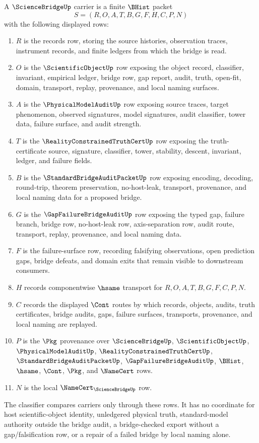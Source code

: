 \begin{definition}
\label{def:science-bridge-carrier}
A $\ScienceBridgeUp$ carrier is a finite $\BHist$ packet
$$
S=(R,O,A,T,B,G,F,H,C,P,N)
$$
with the following displayed rows:
\begin{enumerate}
\item $R$ is the records row, storing the source histories, observation traces, instrument records, and finite ledgers from which the bridge is read.
\item $O$ is the $\ScientificObjectUp$ row exposing the object record, classifier, invariant, empirical ledger, bridge row, gap report, audit, truth, open-fit, domain, transport, replay, provenance, and local naming surfaces.
\item $A$ is the $\PhysicalModelAuditUp$ row exposing source traces, target phenomenon, observed signatures, model signatures, audit classifier, tower data, failure surface, and audit strength.
\item $T$ is the $\RealityConstrainedTruthCertUp$ row exposing the truth-certificate source, signature, classifier, tower, stability, descent, invariant, ledger, and failure fields.
\item $B$ is the $\StandardBridgeAuditPacketUp$ row exposing encoding, decoding, round-trip, theorem preservation, no-host-leak, transport, provenance, and local naming data for a proposed bridge.
\item $G$ is the $\GapFailureBridgeAuditUp$ row exposing the typed gap, failure branch, bridge row, no-host-leak row, axis-separation row, audit route, transport, replay, provenance, and local naming data.
\item $F$ is the failure-surface row, recording falsifying observations, open prediction gaps, bridge defeats, and domain exits that remain visible to downstream consumers.
\item $H$ records componentwise $\hsame$ transport for $R,O,A,T,B,G,F,C,P,N$.
\item $C$ records the displayed $\Cont$ routes by which records, objects, audits, truth certificates, bridge audits, gaps, failure surfaces, transports, provenance, and local naming are replayed.
\item $P$ is the $\Pkg$ provenance over $\ScienceBridgeUp$, $\ScientificObjectUp$, $\PhysicalModelAuditUp$, $\RealityConstrainedTruthCertUp$, $\StandardBridgeAuditPacketUp$, $\GapFailureBridgeAuditUp$, $\BHist$, $\hsame$, $\Cont$, $\Pkg$, and $\NameCert$ rows.
\item $N$ is the local $\NameCert_{\ScienceBridgeUp}$ row.
\end{enumerate}
The classifier compares carriers only through these rows. It has no coordinate for host scientific-object identity, unledgered physical truth, standard-model authority outside the bridge audit, a bridge-checked export without a gap/falsification row, or a repair of a failed bridge by local naming alone.
\end{definition}

